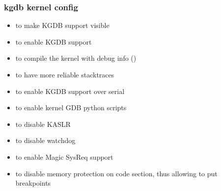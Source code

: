 {
\begin{frame}
  \frametitle{kgdb kernel config}
  \begin{itemize}
    \item {} to make KGDB support visible
    \item {} to enable KGDB support
    \item {} to compile the kernel with debug info ()
    \item {} to have more reliable
          stacktraces
    \item {} to enable KGDB support
          over serial
    \item {} to enable kernel GDB python
          scripts
    \item {} to disable KASLR
    \item {} to disable watchdog
    \item {} to enable Magic SysReq support
    \item {} to disable memory protection
          on code section, thus allowing to put breakpoints
  \end{itemize}
\end{frame}

}
